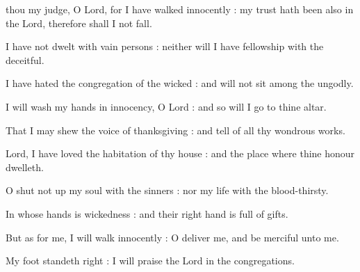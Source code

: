 
 thou my judge, O Lord, for I have walked innocently : my trust hath been also in the Lord, therefore shall I not fall.\par
{}
I have not dwelt with vain persons : neither will I have fellowship with the deceitful.\par
{}I have hated the congregation of the wicked : and will not sit among the ungodly.\par
{}I will wash my hands in innocency, O Lord : and so will I go to thine altar.\par
{}That I may shew the voice of thanksgiving : and tell of all thy wondrous works.\par
{}Lord, I have loved the habitation of thy house : and the place where thine honour dwelleth.\par
{}O shut not up my soul with the sinners : nor my life with the blood-thirsty.\par
{}In whose hands is wickedness : and their right hand is full of gifts.\par
{}But as for me, I will walk innocently : O deliver me, and be merciful unto me.\par
{}My foot standeth right : I will praise the Lord in the congregations.\par



